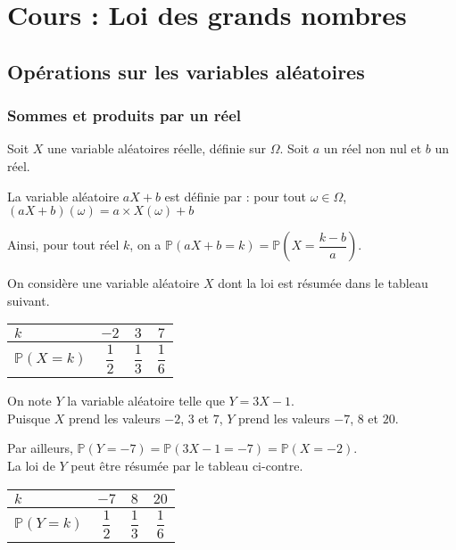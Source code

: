 \documentclass[11pt,fleqn, openany]{book} %
\begin{document}

\chapter{Cours : Loi des grands nombres}


\section{Opérations sur les variables aléatoires}

\subsection{Sommes et produits par un réel}

\begin{definition}Soit $X$ une variable aléatoires réelle, définie sur $\Omega$. Soit $a$ un réel non nul et $b$ un réel. 

La variable aléatoire $aX+b$ est définie par : pour tout $\omega \in \Omega$, $(aX+b)(\omega) = a \times X(\omega) +b$

Ainsi, pour tout réel $k$, on a $\mathbb{P}(aX+b=k) = \mathbb{P}\left( X = \dfrac{k-b}{a} \right)$.\end{definition}

\begin{example}On considère une variable aléatoire $X$ dont la loi est résumée dans le tableau suivant.

\renewcommand{\arraystretch}{2.2}
\begin{center}
\begin{tabular}{|l|c|c|c|}
\hline
$k$ & $-2$& $3$ & $7$ \\
\hline
$\mathbb{P}(X=k)$ & $\dfrac{1}{2}$ & $\dfrac{1}{3}$ & $\dfrac{1}{6}$\\
\hline \end{tabular}
\end{center}

\begin{minipage}{0.68\linewidth}On note $Y$ la variable aléatoire telle que $Y=3X-1$.\\ 
Puisque $X$ prend les valeurs $-2$, $3$ et $7$, $Y$ prend les valeurs $-7$, $8$ et $20$. 

Par ailleurs, $\mathbb{P}(Y=-7)=\mathbb{P}(3X-1=-7)=\mathbb{P}(X=-2)$.\\
La loi de $Y$ peut être résumée par le tableau ci-contre.\end{minipage}\hfill\begin{minipage}{0.27\linewidth}

\renewcommand{\arraystretch}{2.2}
\begin{tabular}{|l|c|c|c|}
\hline
$k$ & $-7$& $8$ & $20$ \\
\hline
$\mathbb{P}(Y=k)$ & $\dfrac{1}{2}$ & $\dfrac{1}{3}$ & $\dfrac{1}{6}$\\
\hline \end{tabular}
\end{minipage}
\end{example}
\end{document}

